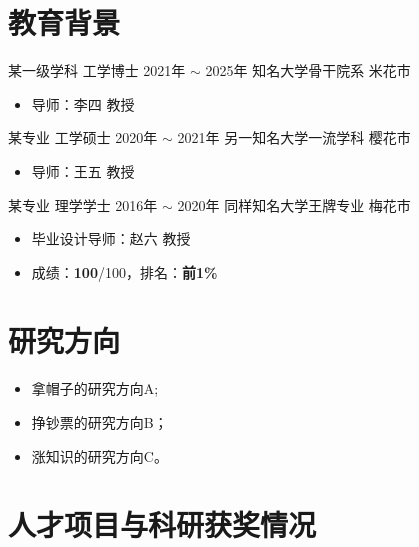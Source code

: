 \documentclass[a4paper,11pt]{article}
\begin{document}
\section{教育背景}

\experience
	{某一级学科 工学博士}
	{2021年 $\sim$ 2025年}
	{知名大学骨干院系}
	{米花市}
	{\begin{itemize}
		\item[-] 导师：李四 教授
	\end{itemize}}

\experience
	{某专业 工学硕士}
	{2020年 $\sim$ 2021年}
	{另一知名大学一流学科}
	{樱花市}
	{\begin{itemize}
		\item[-] 导师：王五 教授
	\end{itemize}}

\experience
	{某专业 理学学士}
	{2016年 $\sim$ 2020年}
	{同样知名大学王牌专业}
	{梅花市}
	{\begin{itemize}
		\item[-] 毕业设计导师：赵六 教授
		\item[-] 成绩：\textbf{100}/100，排名：\textbf{前1\%}
	\end{itemize}}

\section{研究方向}

\begin{text}
\begin{itemize}[leftmargin=1em]
	\item 拿帽子的研究方向A;
	\item 挣钞票的研究方向B；
	\item 涨知识的研究方向C。
\end{itemize}
\end{text}


\section{人才项目与科研获奖情况}

\end{document}
